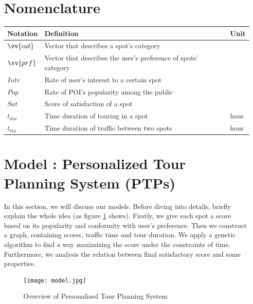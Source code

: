 \documentclass{mcmthesis}
\newcommand{\RNum}[1]{\uppercase\expandafter{\romannumeral #1\relax}}
\begin{document}
\section{Nomenclature}
  \begin{tabular}{lll}    %
    \toprule
    Notation & Definition & Unit \\
    \midrule
    $\vv{cat}$ & Vector that describes a spot's category & \\
    $\vv{prf}$ & Vector that describes the user's preference of spots' category & \\
    $Intr$ & Rate of user's interest to a certain spot & \\
    $Pop$ & Rate of POI's popularity among the public & \\
    $Sat$ & Score of satisfaction of a spot & \\
    $t_{dur}$ & Time duration of touring in a spot & hour \\
    $t_{tra}$ & Time duration of traffic between two spots & hour \\
    \bottomrule
  \end{tabular}


\section{Model \RNum{1}: Personalized Tour Planning System (PTPs)} \label{section:model1}
  In this section, we will discuss our models. Before diving into details, briefly explain the whole idea (as figure \ref{fig:model} shows). Firstly, we give each spot a score based on its popularity and conformity with user's preference. Then we construct a graph, containing scores, traffic time and tour duration. We apply a genetic algorithm to find a way maximizing the score under the constraints of time. Furthermore, we analysis the relation between final satisfactory score and some properties.
  \begin{figure}[ht]
    \centering
    \texttt{[image: model.jpg]}
    \caption{Overview of Personalized Tour Planning System}
    \label{fig:model}
  \end{figure}
\end{document}
